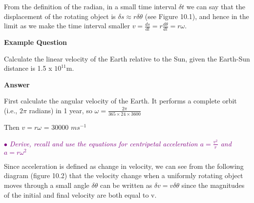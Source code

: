 \documentclass[a4paper,11pt,twoside]{memoir}
\newcounter{spec}[chapter]
\newcommand{\spec}[1]{\Needspace{5\baselineskip}\textcolor{purple}{$\bullet$\hspace{0.5cm}\textit{#1}}}
\newcommand{\answer}{\par \textbf{Answer} \par}
\newenvironment{example}
{\begin{lrbox}{\examplebox}\begin{minipage}{0.9\textwidth}\textbf{Example Question}\par}
{\end{minipage}\end{lrbox}\fbox{\usebox{\examplebox}}}
\begin{document}
From the definition of the radian, in a small time interval $\delta t$ we can say that the displacement of the rotating object is $\delta s \approx r\delta\theta$ (see Figure 10.1), and hence in the limit as we make the time interval smaller $v=\frac{ds}{dt} = r\frac{d\theta}{dt}=r\omega$.

\begin{example}
	Calculate the linear velocity of the Earth relative to the Sun, given the Earth-Sun distance is 1.5 x $10^{11} $m.

\answer First calculate the angular velocity of the Earth. It performs a complete orbit (i.e., $2\pi$ radians) in 1 year, so $\omega= \frac{2\pi}{365\times24\times3600}$

Then $v=r\omega$ = 30000 $ms^{-1}$
\end{example}
\spec{
	Derive, recall and use the equations for centripetal acceleration $a = \frac{v ^{2}}{r}$ and $a = r\omega ^{2}$
}

Since acceleration is defined as change in velocity, we can see from the following diagram (figure 10.2) that the velocity change when a uniformly rotating object moves through a small angle $\delta\theta$ can be written as $\delta v = v\delta\theta$ since the magnitudes of the initial and final velocity are both equal to v.
\\
\\

\begin{figure}[h]
	\begin{center}
	\end{center}
	\caption{}
\end{figure}
\end{document}

